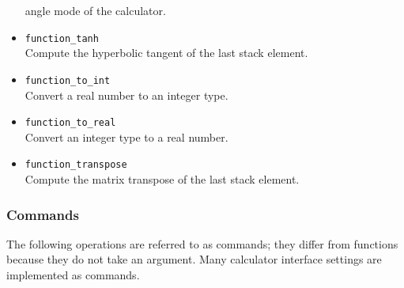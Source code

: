\documentclass[11pt,notitlepage]{article}
\begin{document}
\begin{itemize}
      angle mode of the calculator.
   \item {\tt function\_tanh} \\
      Compute the hyperbolic tangent of the last stack element.
   \item {\tt function\_to\_int} \\
      Convert a real number to an integer type.
   \item {\tt function\_to\_real} \\
      Convert an integer type to a real number.
   \item {\tt function\_transpose} \\
      Compute the matrix transpose of the last stack element.
\end{itemize}


\subsubsection{Commands}
\label{commands}
The following operations are referred to as commands; they differ from functions because
they do not take an argument.  Many calculator interface settings are implemented as commands.
\end{document}
